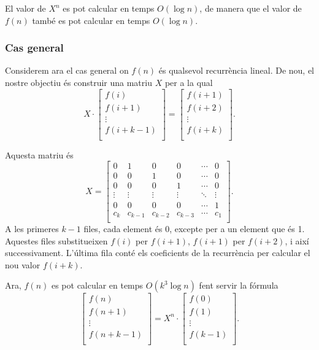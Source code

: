 El valor de $X^n$ es pot calcular en temps $O(\log n)$, de manera que
el valor de $f(n)$ també es pot calcular en temps $O(\log n)$.

\subsubsection{Cas general}

Considerem ara el cas general on $f(n)$ és qualsevol recurrència
lineal. De nou, el nostre objectiu és construir una matriu $X$ per a
la qual
\[ X \cdot \begin{bmatrix} f(i) \\ f(i+1) \\ \vdots \\ f(i+k-1) \\ \end{bmatrix} = \begin{bmatrix} f (i+1) \\ f(i+2) \\ \vdots \\ f(i+k) \\ \end{bmatrix}. \]

Aquesta matriu és
\[
X =
 \begin{bmatrix}
  0 & 1 & 0 & 0 & \cdots & 0 \\
  0 & 0 & 1 & 0 & \cdots & 0 \\
  0 & 0 & 0 & 1 & \cdots & 0 \\
  \vdots & \vdots & \vdots & \vdots & \ddots & \vdots \\
  0 & 0 & 0 & 0 & \cdots & 1 \\
  c_k & c_{k-1} & c_{k-2} & c_{k-3} & \cdots & c_1 \\
 \end{bmatrix}.
\]
A les primeres $k-1$ files, cada element és 0, excepte per a un
element que és 1. Aquestes files substitueixen $f(i)$ per $f(i+1)$,
$f(i+1)$ per $ f(i+2)$, i així successivament. L'última fila conté els
coeficients de la recurrència per calcular el nou valor $f(i+k)$.

Ara, $f(n)$ es pot calcular en temps $O(k^3 \log n)$ fent servir la fórmula
\[
 \begin{bmatrix}
  f(n) \\
  f(n+1) \\
  \vdots \\
  f(n+k-1) \\
 \end{bmatrix}
=
X^n \cdot
 \begin{bmatrix}
  f(0) \\
  f(1) \\
  \vdots \\
  f(k-1) \\
 \end{bmatrix}.
\]


